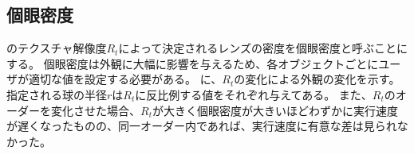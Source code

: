 \newpage
\subsection{個眼密度}
\label{SSTexReso}

のテクスチャ解像度$R_t$によって決定されるレンズの密度を個眼密度と呼ぶことにする。
個眼密度は外観に大幅に影響を与えるため、各オブジェクトごとにユーザが適切な値を設定する必要がある。
に、$R_t$の変化による外観の変化を示す。
指定される球の半径$r$は$R_t$に反比例する値をそれぞれ与えてある。
また、$R_t$のオーダーを変化させた場合、$R_t$が大きく個眼密度が大きいほどわずかに実行速度が遅くなったものの、同一オーダー内であれば、実行速度に有意な差は見られなかった。

\begin{figure}[htbp]
  \centering
{}
\\
\end{figure}
